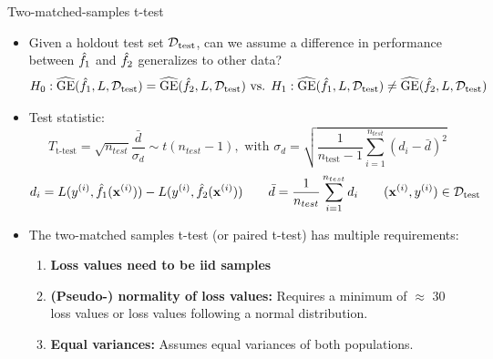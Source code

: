 \documentclass[11pt,compress,t,notes=noshow, aspectratio=169, xcolor=table]{beamer}
\begin{document}
\begin{frame}{Two-matched-samples t-test}

    
    
    \begin{itemize}
        \item Given a holdout test set $\mathcal{D}_{\text{test}}$, can we assume a difference in performance between $\hat{f}_1$ and $\hat{f}_2$ generalizes to other data?
        $$H_0: \widehat{\mathrm{GE}}(\hat{f}_1, L, \mathcal{D}_{\text{test}}) = \widehat{\mathrm{GE}}(\hat{f}_2, L, \mathcal{D}_{\text{test}}) \text{ vs. } H_1: \widehat{\mathrm{GE}}(\hat{f}_1, L, \mathcal{D}_{\text{test}}) \neq \widehat{\mathrm{GE}}(\hat{f}_2, L, \mathcal{D}_{\text{test}})$$
        \item Test statistic: 
            $$
            T_{\text{t-test}} = \sqrt{n_{test}} \frac{\bar{d}}{\sigma_{d}} \sim t(n_{test} - 1), \text{ with }
            \sigma_{d} = \sqrt{\frac{1}{n_{\text{test}} - 1}\sum_{i=1}^{n_{test}} \left(d_i - \bar{d} \right)^2}
        $$
        $$d_i = L(y^{(i)}, \hat{f}_1 (\mathbf{x}^{(i)})) - L(y^{(i)}, \hat{f}_2 (\mathbf{x}^{(i)}))\qquad \bar{d} = \frac{1}{n_{test}} \sum\limits_{i=1}^{n_{test}} d_i \qquad (\mathbf{x}^{(i)}, y^{(i)}) \in \mathcal{D}_{\text{test}}$$
        \item The two-matched samples t-test (or paired t-test) has multiple requirements:
        \begin{enumerate}
            \item \textbf{Loss values need to be iid samples} %
            
            \item \textbf{(Pseudo-) normality of loss values:} 
            Requires a minimum of $\approx$ 30 loss values or loss values following a normal distribution.
            \item \textbf{Equal variances:} Assumes equal variances of both populations. %
        \end{enumerate}
    \end{itemize}
\end{frame}

    
\end{document}
